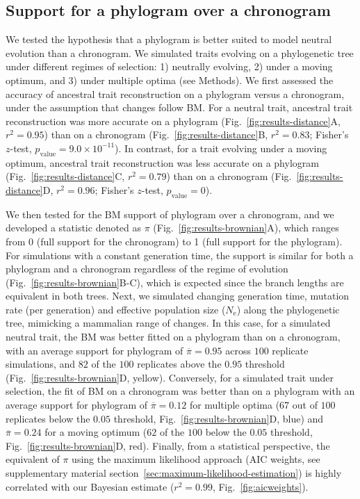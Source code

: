 \documentclass{article}
\newcommand{\Ne}{N_{\text{e}}}
\newcommand{\PhyloSupport}{\pi}
\newcommand{\MeanPhyloSupport}{\overline{\PhyloSupport}}
\begin{document}
\subsection*{Support for a phylogram over a chronogram}
We tested the hypothesis that a phylogram is better suited to model neutral evolution than a chronogram.
We simulated traits evolving on a phylogenetic tree under different regimes of selection: 1) neutrally evolving, 2) under a moving optimum, and 3) under multiple optima (see Methods).
We first assessed the accuracy of ancestral trait reconstruction on a phylogram versus a chronogram, under the assumption that changes follow BM.
For a neutral trait, ancestral trait reconstruction was more accurate on a phylogram (Fig.~\ref{fig:results-distance}A, $r^2=0.95$) than on a chronogram (Fig.~\ref{fig:results-distance}B, $r^2=0.83$; Fisher's $z$-test, $p_{\text{value}}=9.0\times 10^{-11}$).
In contrast, for a trait evolving under a moving optimum, ancestral trait reconstruction was less accurate on a phylogram (Fig.~\ref{fig:results-distance}C, $r^2=0.79$) than on a chronogram (Fig.~\ref{fig:results-distance}D, $r^2=0.96$; Fisher's $z$-test, $p_{\text{value}}=0$).

We then tested for the BM support of phylogram over a chronogram, and we developed a statistic denoted as $\PhyloSupport$ (Fig.~\ref{fig:results-brownian}A), which ranges from 0 (full support for the chronogram) to 1 (full support for the phylogram).
For simulations with a constant generation time, the support is similar for both a phylogram and a chronogram regardless of the regime of evolution (Fig.~\ref{fig:results-brownian}B-C), which is expected since the branch lengths are equivalent in both trees.
Next, we simulated changing generation time, mutation rate (per generation) and effective population size ($\Ne$) along the phylogenetic tree, mimicking a mammalian range of changes.
In this case, for a simulated neutral trait, the BM was better fitted on a phylogram than on a chronogram, with an average support for phylogram of $\MeanPhyloSupport = 0.95$ across $100$ replicate simulations, and $82$ of the $100$ replicates above the $0.95$ threshold (Fig.~\ref{fig:results-brownian}D, yellow).
Conversely, for a simulated trait under selection, the fit of BM on a chronogram was better than on a phylogram with an average support for phylogram of $\MeanPhyloSupport = 0.12$ for multiple optima ($67$ out of $100$ replicates below the $0.05$ threshold, Fig.~\ref{fig:results-brownian}D, blue) and $\MeanPhyloSupport = 0.24$ for a moving optimum ($62$ of the $100$ below the $0.05$ threshold, Fig.~\ref{fig:results-brownian}D, red).
Finally, from a statistical perspective, the equivalent of $\PhyloSupport$ using the maximum likelihood approach (AIC weights, see supplementary material section~\ref{sec:maximum-likelihood-estimation}) is highly correlated with our Bayesian estimate ($r^2=0.99$, Fig.~\ref{fig:aicweights}).
\end{document}
